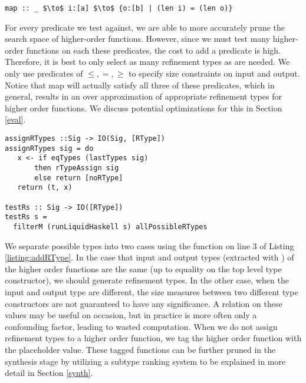 \begin{lstlisting}[numbers=none]
map :: _ $\to$ i:[a] $\to$ {o:[b] | (len i) = (len o)}
\end{lstlisting}


For every predicate we test against, we are able to more accurately prune the search space of higher-order functions.
However, since we must test many higher-order functions on each these predicates, the cost to add a predicate is high.
Therefore, it is best to only select as many refinement types as are needed.
We only use predicates of $\leq,=,\geq$ to specify size constraints on input and output.
Notice that map will actually satisfy all three of these predicates, which in general, results in an over approximation of appropriate refinement types for higher order functions.
We discuss potential optimizations for this in Section \ref{eval}.

\begin{lstlisting}[caption=Adding refinement types to higher order functions,label=listing:addRType]
assignRTypes ::Sig -> IO(Sig, [RType])
assignRTypes sig = do
   x <- if eqTypes (lastTypes sig) 
       then rTypeAssign sig
       else return [noRType]
   return (t, x)

testRs :: Sig -> IO([RType])
testRs s =
  filterM (runLiquidHaskell s) allPossibleRTypes
\end{lstlisting}

We separate possible types into two cases using the  function on line 3 of Listing \ref{listing:addRType}.
In the case that input and output types (extracted with ) of the higher order functions are the same (up to equality on the top level type constructor), we should generate refinement types.
In the other case, when the input and output type are different, the size measures between two different type constructors are not guaranteed to have any significance.
A relation on these values may be useful on occasion, but in practice is more often only a confounding factor, leading to wasted computation.
When we do not assign refinement types to a higher order function, we tag the higher order function with the placeholder  value.
These  tagged functions can be further pruned in the synthesis stage by utilizing a subtype ranking system to be explained in more detail in Section \ref{synth}.

